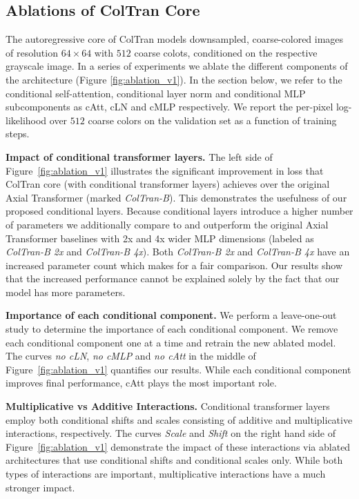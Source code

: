 \documentclass{article} \usepackage{iclr2021_conference,times}
\begin{document}
\subsection{Ablations of ColTran Core}
\label{ablations}

The autoregressive core of ColTran models downsampled, coarse-colored images of resolution $64 \times 64$ with $512$ coarse colots, conditioned on the respective grayscale image. In a series of experiments we ablate the different components of the architecture (Figure \ref{fig:ablation_v1}). In the section below, we refer to the conditional self-attention, conditional layer norm and conditional MLP subcomponents as cAtt, cLN and cMLP respectively. We report the per-pixel log-likelihood over $512$ coarse colors on the validation set as a function of training steps.


\textbf{Impact of conditional transformer layers.} The left side of Figure~\ref{fig:ablation_v1} illustrates the significant  improvement in loss that ColTran core (with conditional transformer layers) achieves over the original Axial Transformer (marked \textit{ColTran-B}). This demonstrates the usefulness of our proposed conditional layers. Because conditional layers introduce a higher number of parameters we additionally compare to and outperform the original Axial Transformer baselines with 2x and 4x wider MLP dimensions (labeled as \textit{ColTran-B 2x} and \textit{ColTran-B 4x}). Both \textit{ColTran-B 2x} and \textit{ColTran-B 4x} have an increased parameter count which makes for a fair comparison. Our results show that the increased performance cannot be explained solely by the fact that our model has more parameters.

\textbf{Importance of each conditional component.} We perform a leave-one-out study to determine the importance of each conditional component. We remove each conditional component one at a time and retrain the new ablated model. The curves \textit{no cLN}, \textit{no cMLP} and \textit{no cAtt} in the middle of Figure~\ref{fig:ablation_v1} quantifies our results. While each conditional component improves final performance, cAtt plays the most important role.

\textbf{Multiplicative vs Additive Interactions.}  Conditional transformer layers employ both conditional shifts and scales consisting of additive and multiplicative interactions, respectively. The curves \textit{Scale} and \textit{Shift} on the right hand side of Figure~\ref{fig:ablation_v1} demonstrate the impact of these interactions via ablated architectures that use conditional shifts and conditional scales only. While both types of interactions are important, multiplicative interactions have a much stronger impact.
\end{document}
